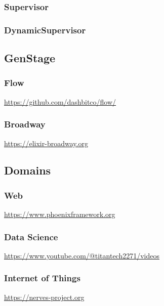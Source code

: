 {\subsubsection{Supervisor}
\subsubsection{DynamicSupervisor}

\subsection{GenStage}
\subsubsection{Flow}

\url{https://github.com/dashbitco/flow/}

\subsubsection{Broadway}

\url{https://elixir-broadway.org}

\subsection{Domains}

\subsubsection{Web}

\url{https://www.phoenixframework.org}



\subsubsection{Data Science}

\url{https://www.youtube.com/@titantech2271/videos}

\subsubsection{Internet of Things}

\url{https://nerves-project.org}

}
